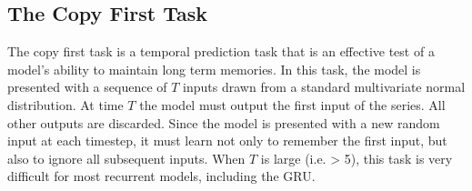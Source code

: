 \subsection*{The Copy First Task}

The copy first task is a temporal prediction task that is an effective test of a model's ability to maintain long term memories. In this task, the model is presented with a sequence of \(T\) inputs drawn from a standard multivariate normal distribution. At time \(T\) the model must output the first input of the series. All other outputs are discarded. Since the model is presented with a new random input at each timestep, it must learn not only to remember the first input, but also to ignore all subsequent inputs. When \(T\) is large (i.e. > 5), this task is very difficult for most recurrent models, including the GRU.
